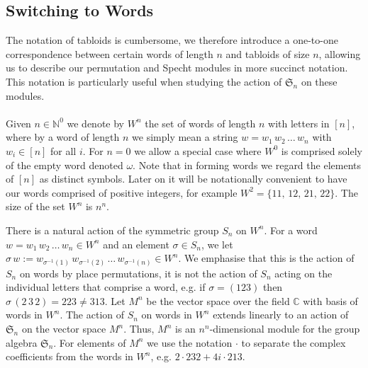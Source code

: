 \documentclass[11pt]{report}
\begin{document}
\subsection{Switching to Words }
\label{chpt4:subsec:words}
The notation of tabloids is cumbersome, we therefore introduce a one-to-one correspondence between certain words of length $n$ and tabloids of size $n$, allowing us to describe our permutation and Specht modules in more succinct notation. This notation is particularly useful when studying the action of $\mathfrak{S}_{n}$ on these modules.

\paragraph{}
Given $n\in \mathbb{N}^{0}$ we denote by $W^n$ the set of words of length $n$ 
with letters in $[n]$, where by a word of length $n$ we simply mean a 
string $w=w_1\, w_2 \,\ldots \,
w_n$ with $w_{i} \in [n]$ for all $i$. For $n=0$ we allow a special case where $W^{0}$ is comprised solely of the empty word denoted $\omega$. Note that in forming words we regard 
the elements of $[n]$ as distinct symbols. Later on it will be notationally convenient to have our words comprised of positive integers, for example $W^{2} = \{11,\, 
12, \,  21, \, 22\}$. The size of the set $W^{n}$ is $n^{n}$.


There is a natural action of the symmetric group $S_n$ on $W^n$. For a 
word $w=w_1\, w_2\, \ldots \, w_n \in W^n$ and an element $\sigma 
\in S_n$, we let 
$\sigma \, w := w_{\sigma^{-1}(1)}\, w_{\sigma^{-1}(2)}\, \ldots 
\, w_{\sigma^{-1}(n)} \in W^n$. 
We emphasise that this is the action of $S_n$ on words by place 
permutations, it is not the action of $S_n$ acting on the individual 
letters that comprise a word, 
e.g. if $\sigma = (123)$ then $\sigma \, (2\,3\,2) = 223  \neq 313$.
Let $M^{n}$ be the vector space over the field $\mathbb{C}$ with basis of 
words in $W^n$. The action of $S_{n}$ on words in $W^{n}$ extends linearly 
to an action of $\mathfrak{S}_{n}$ on the vector space $M^{n}$. Thus, 
$M^{n}$ is an $n^{n}$-dimensional module for the group algebra 
$\mathfrak{S}_{n}$. For elements of $M^{n}$ we use the notation $\cdot$ to separate the complex coefficients from the words in $W^{n}$, e.g. $2 \cdot 232 + 4i \cdot 213$.
\end{document}
